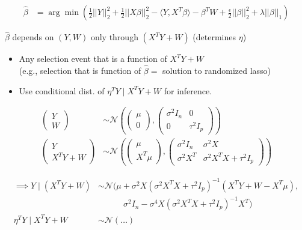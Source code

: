 \begin{align*}
    \hat{\beta} &= \arg\min \left( \frac{1}{2} ||Y||_2^2 + \frac{1}{2} ||X\beta||_2^2 - \langle Y, X^T \beta \rangle - \beta^T W + \frac{\epsilon}{2} ||\beta||_2^2 + \lambda ||\beta||_1 \right)
\end{align*}

$\hat{\beta}$ depends on $(Y, W)$ only through $(X^T Y + W)$ (determines $\eta$)

\begin{itemize}
    \item Any selection event that is a function of $X^T Y + W$ \\
    (e.g., selection that is function of $\hat{\beta} =$ solution to randomized lasso)
    \item Use conditional dist. of $\eta^T Y \mid X^T Y + W$ for inference.
\end{itemize}

\begin{align*}
    \begin{pmatrix} Y \\ W \end{pmatrix} &\sim \mathcal{N} \left( \begin{pmatrix} \mu \\ 0 \end{pmatrix}, \begin{pmatrix} \sigma^2 I_n & 0 \\ 0 & \tau^2 I_p \end{pmatrix} \right) \\
    \begin{pmatrix} Y \\ X^T Y + W \end{pmatrix} &\sim \mathcal{N} \left( \begin{pmatrix} \mu \\ X^T \mu \end{pmatrix}, \begin{pmatrix} \sigma^2 I_n & \sigma^2 X \\ \sigma^2 X^T & \sigma^2 X^T X + \tau^2 I_p \end{pmatrix} \right)
\end{align*}

\begin{align*}
    \implies Y \mid (X^T Y + W) &\sim \mathcal{N} \Big( \mu + \sigma^2 X(\sigma^2 X^T X + \tau^2 I_p)^{-1} (X^T Y + W - X^T \mu), \\
    & \quad \quad \quad \sigma^2 I_n - \sigma^4 X(\sigma^2 X^T X + \tau^2 I_p)^{-1} X^T \Big) \\
    \eta^T Y \mid X^T Y + W &\sim \mathcal{N}(\dots)
\end{align*}

